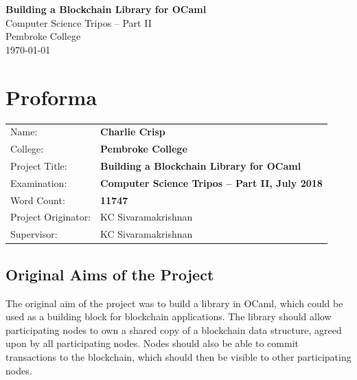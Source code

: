\documentclass[12pt,a4paper,twoside,openright]{report}
\begin{document}
	\pagestyle{empty}
	
	
	\vspace*{60mm}
	\begin{center}
	\Huge
	\textbf{Building a Blockchain Library for OCaml} \\[5mm]
	Computer Science Tripos -- Part II \\[5mm]
	Pembroke College \\[5mm]
	\today  %
	\end{center}
	
	
	\pagestyle{plain}
	
	\chapter*{Proforma}
	
	{\large
	\begin{tabular}{ll}
	Name:               & \bf Charlie Crisp                       \\
	College:            & \bf Pembroke College                     \\
	Project Title:      & \bf Building a Blockchain Library for OCaml \\
	Examination:        & \bf Computer Science Tripos -- Part II, July 2018  \\
	Word Count:         & \bf 11747 \footnotemark[1] \\
	Project Originator: & KC Sivaramakrishnan                    \\
	Supervisor:         & KC Sivaramakrishnan                    
	\end{tabular}
	}
	
	
	\section*{Original Aims of the Project}
	
	The original aim of the project was to build a library in OCaml, which could be used as a building block for blockchain applications. 
	The library should allow participating nodes to own a shared copy of a blockchain data structure, agreed upon by all participating nodes.
	Nodes should also be able to commit transactions to the blockchain, which should then be visible to other participating nodes. 
	
\end{document}

